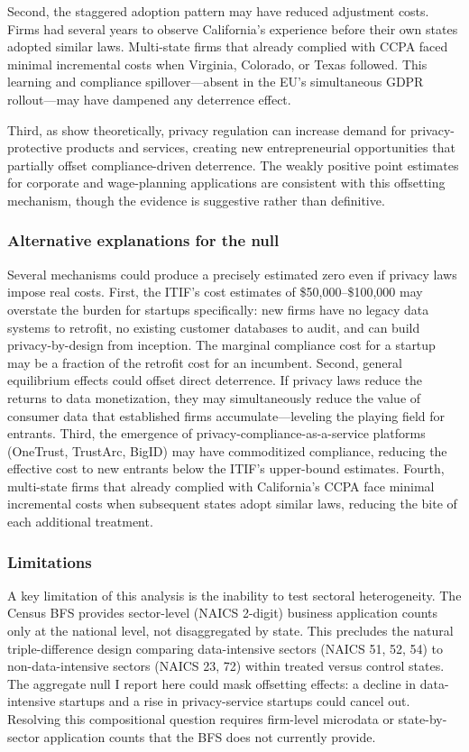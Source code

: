 \documentclass[12pt]{article}
\begin{document}
Second, the staggered adoption pattern may have reduced adjustment costs. Firms had several years to observe California's experience before their own states adopted similar laws. Multi-state firms that already complied with CCPA faced minimal incremental costs when Virginia, Colorado, or Texas followed. This learning and compliance spillover---absent in the EU's simultaneous GDPR rollout---may have dampened any deterrence effect.

Third, as \citet{campbell2015} show theoretically, privacy regulation can increase demand for privacy-protective products and services, creating new entrepreneurial opportunities that partially offset compliance-driven deterrence. The weakly positive point estimates for corporate and wage-planning applications are consistent with this offsetting mechanism, though the evidence is suggestive rather than definitive.

\subsubsection*{Alternative explanations for the null} Several mechanisms could produce a precisely estimated zero even if privacy laws impose real costs. First, the ITIF's cost estimates of \$50,000--\$100,000 may overstate the burden for startups specifically: new firms have no legacy data systems to retrofit, no existing customer databases to audit, and can build privacy-by-design from inception. The marginal compliance cost for a startup may be a fraction of the retrofit cost for an incumbent. Second, general equilibrium effects could offset direct deterrence. If privacy laws reduce the returns to data monetization, they may simultaneously reduce the value of consumer data that established firms accumulate---leveling the playing field for entrants. Third, the emergence of privacy-compliance-as-a-service platforms (OneTrust, TrustArc, BigID) may have commoditized compliance, reducing the effective cost to new entrants below the ITIF's upper-bound estimates. Fourth, multi-state firms that already complied with California's CCPA face minimal incremental costs when subsequent states adopt similar laws, reducing the bite of each additional treatment.

\subsubsection*{Limitations} A key limitation of this analysis is the inability to test sectoral heterogeneity. The Census BFS provides sector-level (NAICS 2-digit) business application counts only at the national level, not disaggregated by state. This precludes the natural triple-difference design comparing data-intensive sectors (NAICS 51, 52, 54) to non-data-intensive sectors (NAICS 23, 72) within treated versus control states. The aggregate null I report here could mask offsetting effects: a decline in data-intensive startups and a rise in privacy-service startups could cancel out. Resolving this compositional question requires firm-level microdata or state-by-sector application counts that the BFS does not currently provide.
\end{document}
